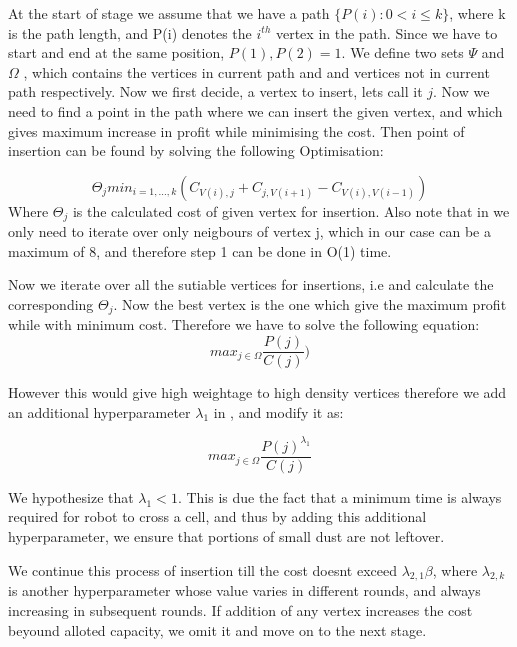 \documentclass{article}
\begin{document}
At the start of stage we assume that we have a path $\{P(i) : 0<i \leq k\}$, where k is the path length, and P(i) denotes the $i^{th}$ vertex in the path.
Since we have to start and end at the same position,
$P(1),P(2) = 1$.
We define two sets $\Psi$ and $\Omega$
, which contains the vertices in current path and and vertices not in current path respectively.
Now we first decide, a vertex to insert, lets call it $j$. Now we need to find a point in the path where we can insert the given vertex, and which gives maximum increase in profit while minimising the cost.
Then point of insertion can be found by solving the following Optimisation:

\begin{equation} \label{eq2}
    \Theta_{j} min_{i = 1,\dots,k} ( C_{V(i),j} + C_{j,V(i+1)} - C_{V(i),V(i-1)} )
\end{equation}
Where $\Theta_{j}$ is the calculated cost of given vertex for insertion.
Also note that in  we only need to iterate over only neigbours of vertex j, which in our case can be a maximum of 8, and therefore step 1 can be done in O(1) time.

Now we iterate over all the sutiable vertices for insertions, i.e and calculate the corresponding
$\Theta_{j}$. Now the best vertex is the one which give the maximum profit while with minimum cost.
Therefore we have to solve the following equation:
\begin{equation} \label{eq3}
    max_{j \in \Omega} \frac{P(j)}{C(j)} )
\end{equation}

However this would give high weightage to high density vertices therefore we add an additional hyperparameter $\lambda_1$ in ,
and modify it as:

\begin{equation} \label{eq4}
    max_{j \in \Omega}  \frac{P(j)^{\lambda_{1}}}{C(j)}
\end{equation}

We hypothesize that $\lambda_{1} < 1$. This is due the fact that a minimum time is always required for robot to cross a cell, and thus by adding this additional hyperparameter,
we ensure that portions of small dust are not leftover.

We continue this process of insertion till the cost doesnt exceed $\lambda_{2,1} \beta$, where $\lambda_{2,k}$ is another hyperparameter whose value varies in different rounds, and always increasing in subsequent rounds. 
If addition of any vertex increases the cost beyound alloted capacity, we omit it and move on to the next stage.
\end{document}
